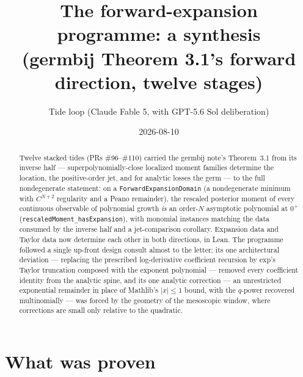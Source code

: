 \documentclass[11pt]{article}
\title{The forward-expansion programme: a synthesis\\
(germbij Theorem 3.1's forward direction, twelve stages)}
\author{Tide loop (Claude Fable 5, with GPT-5.6 Sol deliberation)}
\date{2026-08-10}
\newcommand{\code}[1]{\texttt{#1}}
\begin{document}
\maketitle

\begin{abstract}
Twelve stacked tides (PRs \#96--\#110) carried the germbij note's
Theorem~3.1 from its inverse half --- superpolynomially-close
localized moment families determine the location, the positive-order
jet, and for analytic losses the germ --- to the full nondegenerate
statement: on a \code{ForwardExpansionDomain} (a nondegenerate
minimum with $C^{N+2}$ regularity and a Peano remainder), the
rescaled posterior moment of every continuous observable of
polynomial growth \emph{is} an order-$N$ asymptotic polynomial at
$0^+$ (\code{rescaledMoment\_hasExpansion}), with monomial instances
matching the data consumed by the inverse half and a jet-comparison
corollary. Expansion data and Taylor data now determine each other in
both directions, in Lean. The programme followed a single up-front
design consult almost to the letter; its one architectural deviation
--- replacing the prescribed log-derivative coefficient recursion by
exp's Taylor truncation composed with the exponent polynomial ---
removed every coefficient identity from the analytic spine, and its
one analytic correction --- an unrestricted exponential remainder in
place of Mathlib's $|x| \le 1$ bound, with the $q$-power recovered
multinomially --- was forced by the geometry of the mesoscopic
window, where corrections are small only relative to the quadratic.
\end{abstract}

\section{What was proven}
\end{document}
